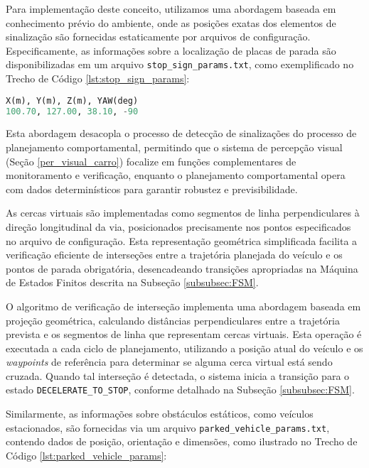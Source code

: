 Para implementação deste conceito, utilizamos uma abordagem baseada em conhecimento prévio do ambiente, onde as posições exatas dos elementos de sinalização são fornecidas estaticamente por arquivos de configuração. Especificamente, as informações sobre a localização de placas de parada são disponibilizadas em um arquivo \texttt{stop\_sign\_params.txt}, como exemplificado no Trecho de Código \ref{lst:stop_sign_params}:

\begin{lstlisting}[language=Python, caption=Exemplo de arquivo de parâmetros de placa de parada., label=lst:stop_sign_params]
X(m), Y(m), Z(m), YAW(deg)
100.70, 127.00, 38.10, -90
\end{lstlisting}

Esta abordagem desacopla o processo de detecção de sinalizações do processo de planejamento comportamental, permitindo que o sistema de percepção visual (Seção \ref{per_visual_carro}) focalize em funções complementares de monitoramento e verificação, enquanto o planejamento comportamental opera com dados determinísticos para garantir robustez e previsibilidade.

As cercas virtuais são implementadas como segmentos de linha perpendiculares à direção longitudinal da via, posicionados precisamente nos pontos especificados no arquivo de configuração. Esta representação geométrica simplificada facilita a verificação eficiente de interseções entre a trajetória planejada do veículo e os pontos de parada obrigatória, desencadeando transições apropriadas na Máquina de Estados Finitos descrita na Subseção \ref{subsubsec:FSM}.

O algoritmo de verificação de interseção implementa uma abordagem baseada em projeção geométrica, calculando distâncias perpendiculares entre a trajetória prevista e os segmentos de linha que representam cercas virtuais. Esta operação é executada a cada ciclo de planejamento, utilizando a posição atual do veículo e os \textit{waypoints} de referência para determinar se alguma cerca virtual está sendo cruzada. Quando tal interseção é detectada, o sistema inicia a transição para o estado \texttt{DECELERATE\_TO\_STOP}, conforme detalhado na Subseção \ref{subsubsec:FSM}.

Similarmente, as informações sobre obstáculos estáticos, como veículos estacionados, são fornecidas via um arquivo \texttt{parked\_vehicle\_params.txt}, contendo dados de posição, orientação e dimensões, como ilustrado no Trecho de Código \ref{lst:parked_vehicle_params}:

